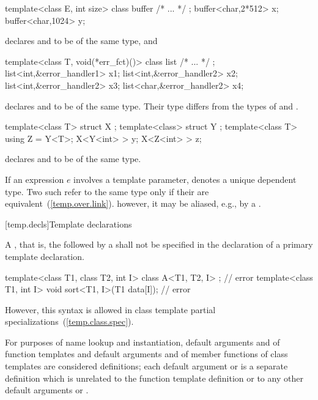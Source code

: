 \begin{codeblock}
template<class E, int size> class buffer { /* ... */ };
buffer<char,2*512> x;
buffer<char,1024> y;
\end{codeblock}

declares
and
to be of the same type, and

\begin{codeblock}
template<class T, void(*err_fct)()> class list { /* ... */ };
list<int,&error_handler1> x1;
list<int,&error_handler2> x2;
list<int,&error_handler2> x3;
list<char,&error_handler2> x4;
\end{codeblock}

declares
and
to be of the same type.
Their type differs from the types of
and
.

\begin{codeblock}
template<class T> struct X { };
template<class> struct Y { };
template<class T> using Z = Y<T>;
X<Y<int> > y;
X<Z<int> > z;
\end{codeblock}

declares  and  to be of the same type.
\exitexample

\pnum
If an expression $e$ involves a template parameter, 
denotes a unique dependent type. Two such 
refer to the same type only if their  are
equivalent~(\ref{temp.over.link}). \enternote however, it may be aliased,
e.g., by a . \exitnote

[temp.decls]{Template declarations}

\pnum
A
,
that is, the
followed by a
shall not be specified in the declaration of a primary template declaration.
\enterexample

\begin{codeblock}
template<class T1, class T2, int I> class A<T1, T2, I> { };     // error
template<class T1, int I> void sort<T1, I>(T1 data[I]);         // error
\end{codeblock}
\exitexample
\enternote
However, this syntax is allowed in class template partial specializations~(\ref{temp.class.spec}).
\exitnote

\pnum
For purposes of name lookup and instantiation,
default arguments and  of function
templates and default arguments and  of
member functions of class templates are considered definitions;
each default argument or  is a separate
definition which is unrelated to
the function template definition or to any other default arguments or
.

